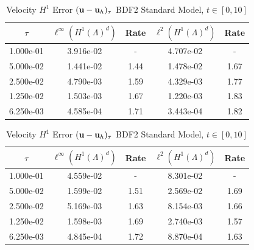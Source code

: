 \documentclass[letterpaper]{erdc}
\begin{document}
\begin{table}[h!]
  \parbox{.45\linewidth}{
  \tiny
  \centering
    \caption{Velocity $H^1$ Error $(\textbf{u} - \textbf{u}_h)_{\tau}$ BDF2 Rotational Model, $t\in[0,10]$}
    \begin{tabular}{c|c|c|c|c}
      $\tau$ &  $\ell^{\infty}\left(H^1(\Lambda)^d\right)$ &  Rate  &  $\ell^2\left(H^1(\Lambda)^d\right)$  &  Rate\\
      \hline
      1.000e-01 & 3.916e-02 &   -  & 4.707e-02 &   - \\
      5.000e-02 & 1.441e-02 & 1.44 & 1.478e-02 & 1.67\\
      2.500e-02 & 4.790e-03 & 1.59 & 4.329e-03 & 1.77\\
      1.250e-02 & 1.503e-03 & 1.67 & 1.220e-03 & 1.83\\
      6.250e-03 & 4.585e-04 & 1.71 & 3.443e-04 & 1.82
    \end{tabular}
    }
    \hfill
    \parbox{.45\linewidth}{
    \tiny
    \centering
      \caption{Velocity $H^1$ Error $(\textbf{u} - \textbf{u}_h)_{\tau}$ BDF2 Standard Model, $t\in[0,10]$}
      \begin{tabular}{c|c|c|c|c}
        $\tau$ &  $\ell^{\infty}\left(H^1(\Lambda)^d\right)$ &  Rate  &  $\ell^2\left(H^1(\Lambda)^d\right)$  &  Rate\\
        \hline
        1.000e-01 & 4.559e-02 &   -  & 8.301e-02 &   - \\
        5.000e-02 & 1.599e-02 & 1.51 & 2.569e-02 & 1.69\\
        2.500e-02 & 5.169e-03 & 1.63 & 8.154e-03 & 1.66\\
        1.250e-02 & 1.598e-03 & 1.69 & 2.740e-03 & 1.57\\
        6.250e-03 & 4.845e-04 & 1.72 & 8.870e-04 & 1.63
      \end{tabular}\tiny
    }
\end{table}
\end{document}
